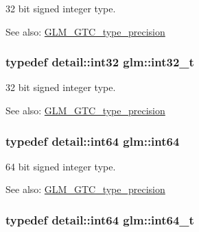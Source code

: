 32 bit signed integer type. \begin{Desc}
\item[See also:]\hyperlink{group__gtc__type__precision}{GLM\_\-GTC\_\-type\_\-precision} \end{Desc}
\hypertarget{group__gtc__type__precision_gb870c0eb6f525b0c8c4716762e0fc3a8}{
\subsubsection[int32\_\-t]{\setlength{\rightskip}{0pt plus 5cm}typedef detail::int32 {\bf glm::int32\_\-t}}}
\label{group__gtc__type__precision_gb870c0eb6f525b0c8c4716762e0fc3a8}


32 bit signed integer type. \begin{Desc}
\item[See also:]\hyperlink{group__gtc__type__precision}{GLM\_\-GTC\_\-type\_\-precision} \end{Desc}
\hypertarget{group__gtc__type__precision_g435d75819cce297cc5fa21bd84ef89a5}{
\subsubsection[int64]{\setlength{\rightskip}{0pt plus 5cm}typedef detail::int64 {\bf glm::int64}}}
\label{group__gtc__type__precision_g435d75819cce297cc5fa21bd84ef89a5}


64 bit signed integer type. \begin{Desc}
\item[See also:]\hyperlink{group__gtc__type__precision}{GLM\_\-GTC\_\-type\_\-precision} \end{Desc}
\hypertarget{group__gtc__type__precision_g6abb23fbf4e39c50ec5341160b5da5ab}{
\subsubsection[int64\_\-t]{\setlength{\rightskip}{0pt plus 5cm}typedef detail::int64 {\bf glm::int64\_\-t}}}
\label{group__gtc__type__precision_g6abb23fbf4e39c50ec5341160b5da5ab}


